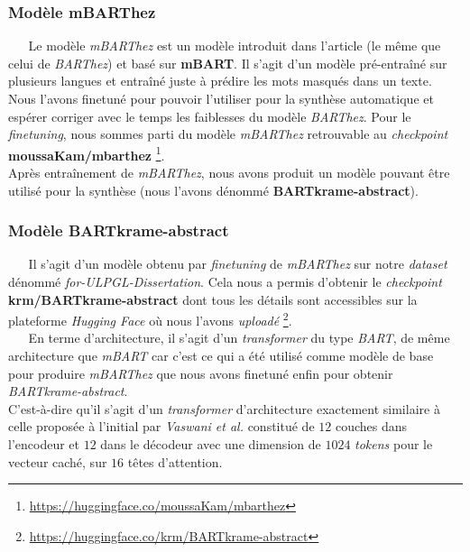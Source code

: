 \subsubsection{Modèle mBARThez}
$ _{} $ $ _{} $ $ _{} $ $ _{} $ $ _{} $Le modèle \textit{mBARThez} est un modèle introduit dans l'article \cite{eddine2020barthez} (le même que celui de \textit{BARThez}) et basé sur \textbf{mBART}. Il s'agit d'un modèle pré-entraîné sur plusieurs langues et entraîné juste à prédire les mots masqués dans un texte. Nous l'avons finetuné pour pouvoir l'utiliser pour la synthèse automatique et espérer corriger avec le temps les faiblesses du modèle \textit{BARThez}. Pour le \textit{finetuning}, nous sommes parti du modèle \textit{mBARThez} re\-trou\-va\-ble au \textit{checkpoint} \textbf{moussaKam/mbarthez} \footnote{\href{https://huggingface.co/moussaKam/mbarthez}{https://huggingface.co/moussaKam/mbarthez}}.\\
Après entraînement de \textit{mBARThez}, nous avons produit un modèle pouvant être utilisé pour la synthèse (nous l'avons dénommé \textbf{BARTkrame-abstract}). 
\subsubsection{Modèle BARTkrame-abstract}
$ _{} $ $ _{} $ $ _{} $ $ _{} $ $ _{} $Il s'agit d'un modèle obtenu par \textit{finetuning} de \textit{mBARThez} sur notre \textit{dataset} dénommé \textit{for-ULPGL-Dissertation}. Cela nous a permis d'obtenir le \textit{checkpoint} \textbf{krm/BARTkrame-abstract} dont tous les détails sont accessibles sur la plateforme \textit{Hugging Face} où nous l'avons \textit{uploadé} \footnote{\href{https://huggingface.co/krm/BARTkrame-abstract}{https://huggingface.co/krm/BARTkrame-abstract}}.\\
$ _{} $ $ _{} $ $ _{} $ $ _{} $ $ _{} $En terme d'architecture, il s'agit d'un \textit{transformer} du type \textit{BART}, de même architecture que \textit{mBART}\cite{mBART_liu2020multilingual} car c'est ce qui a été utilisé comme modèle de base pour produire \textit{mBARThez} que nous avons finetuné enfin pour obtenir \textit{BARTkrame-abstract}.\\
C'est-à-dire qu'il s'agit d'un \textit{transformer} d'architecture exactement similaire à celle proposée à l'initial par \textit{Vaswani et al.} \cite{vaswani2017attention}  constitué de $ 12 $ couches dans l'encodeur et $ 12 $ dans le décodeur avec une dimension de $ 1024 $ \textit{tokens} pour le vecteur caché, sur $ 16 $ têtes d'attention.
